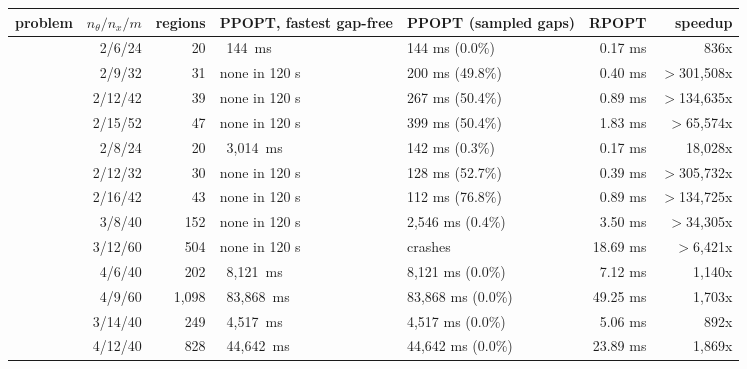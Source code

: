 \begin{tabular}{@{}l r r L{3.6cm} L{3.0cm} r r@{}}
\toprule
problem & $n_\theta/n_x/m$ & regions & PPOPT, fastest gap-free & PPOPT  (sampled gaps) & RPOPT  & speedup \\
\midrule
{} & 2/6/24 & 20 & ~144~ms & 144 ms (0.0\%) & 0.17 ms & 836x \\
 & 2/9/32 & 31 & none in 120 s & 200 ms (49.8\%) & 0.40 ms & $>$301,508x \\
 & 2/12/42 & 39 & none in 120 s & 267 ms (50.4\%) & 0.89 ms & $>$134,635x \\
 & 2/15/52 & 47 & none in 120 s & 399 ms (50.4\%) & 1.83 ms & $>$65,574x \\
 & 2/8/24 & 20 & ~3,014~ms & 142 ms (0.3\%) & 0.17 ms & 18,028x \\
 & 2/12/32 & 30 & none in 120 s & 128 ms (52.7\%) & 0.39 ms & $>$305,732x \\
 & 2/16/42 & 43 & none in 120 s & 112 ms (76.8\%) & 0.89 ms & $>$134,725x \\
 & 3/8/40 & 152 & none in 120 s & 2,546 ms (0.4\%) & 3.50 ms & $>$34,305x \\
 & 3/12/60 & 504 & none in 120 s & crashes & 18.69 ms & $>$6,421x \\
 & 4/6/40 & 202 & ~8,121~ms & 8,121 ms (0.0\%) & 7.12 ms & 1,140x \\
 & 4/9/60 & 1,098 & ~83,868~ms & 83,868 ms (0.0\%) & 49.25 ms & 1,703x \\
 & 3/14/40 & 249 & ~4,517~ms & 4,517 ms (0.0\%) & 5.06 ms & 892x \\
 & 4/12/40 & 828 & ~44,642~ms & 44,642 ms (0.0\%) & 23.89 ms & 1,869x \\
\bottomrule
\end{tabular}